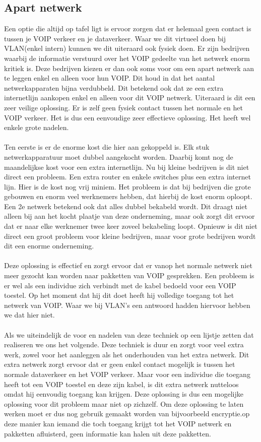 \documentclass[pdftex,a4paper,12pt,twoside]{report}
\begin{document}
\subsection{Apart netwerk}
Een optie die altijd op tafel ligt is ervoor zorgen dat er helemaal geen contact is tussen je VOIP verkeer en je dataverkeer. Waar we dit virtueel doen bij VLAN(enkel intern) kunnen we dit uiteraard ook fysiek doen. Er zijn bedrijven waarbij de informatie verstuurd over het VOIP gedeelte van het netwerk enorm kritiek is. Deze bedrijven kiezen er dan ook soms voor om een apart netwerk aan te leggen enkel en alleen voor hun VOIP. Dit houd in dat het aantal netwerkapparaten bijna verdubbeld. Dit betekend ook dat ze een extra internetlijn aankopen enkel en alleen voor dit VOIP netwerk. Uiteraard is dit een zeer veilige oplossing. Er is zelf geen fysiek contact tussen het normale en het VOIP verkeer. Het is dus een eenvoudige zeer effectieve oplossing. Het heeft wel enkele grote nadelen.
\\ \\
Ten eerste is er de enorme kost die hier aan gekoppeld is. Elk stuk netwerkapparatuur moet dubbel aangekocht worden. Daarbij komt nog de maandelijkse kost voor een extra internetlijn. Nu bij kleine bedrijven is dit niet direct een probleem. Een extra router en enkele switches plus een extra internet lijn. Hier is de kost nog vrij miniem. Het probleem is dat bij bedrijven die grote gebouwen en enorm veel werknemers hebben, dat hierbij de kost enorm oploopt.\\
Een 2e netwerk betekend ook dat alles dubbel bekabeld wordt. Dit draagt niet alleen bij aan het kocht plaatje van deze onderneming, maar ook zorgt dit ervoor dat er naar elke werknemer twee keer zoveel bekabeling loopt. Opnieuw is dit niet direct een groot probleem voor kleine bedrijven, maar voor grote bedrijven wordt dit een enorme onderneming. 
\\ \\
Deze oplossing is effectief en zorgt ervoor dat er vanop het normale netwerk niet meer gezocht kan worden naar pakketten van VOIP gesprekken. Een probleem is er wel als een individue zich verbindt met de kabel bedoeld voor een VOIP toestel. Op het moment dat hij dit doet heeft hij volledige toegang tot het netwerk van VOIP. Waar we bij VLAN's een antwoord hadden hiervoor hebben we dat hier niet. 
\\ \\
Als we uiteindelijk de voor en nadelen van deze techniek op een lijstje zetten dat realiseren we ons het volgende. Deze techniek is duur en zorgt voor veel extra werk, zowel voor het aanleggen als het onderhouden van het extra netwerk. Dit extra netwerk zorgt ervoor dat er geen enkel contact mogelijk is tussen het normale dataverkeer en het VOIP verkeer. Maar voor een individue die toegang heeft tot een VOIP toestel en deze zijn kabel, is dit extra netwerk nutteloos omdat hij eenvoudig toegang kan krijgen. Deze oplossing is dus een mogelijke oplossing voor dit probleem maar niet op zichzelf. Om deze oplossing te laten werken moet er dus nog gebruik gemaakt worden van bijvoorbeeld encryptie.op deze manier kan iemand die toch toegang krijgt tot het VOIP netwerk en pakketten afluisterd, geen informatie kan halen uit deze pakketten.
\end{document}
